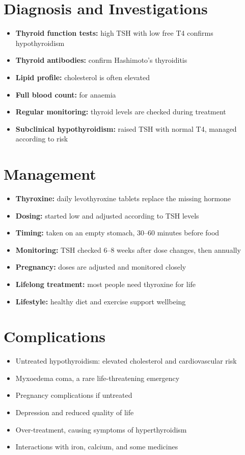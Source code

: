 \section*{Diagnosis and Investigations}
\begin{itemize}
    \item \textbf{Thyroid function tests:} high TSH with low free T4 confirms hypothyroidism
    \item \textbf{Thyroid antibodies:} confirm Hashimoto's thyroiditis
    \item \textbf{Lipid profile:} cholesterol is often elevated
    \item \textbf{Full blood count:} for anaemia
    \item \textbf{Regular monitoring:} thyroid levels are checked during treatment
    \item \textbf{Subclinical hypothyroidism:} raised TSH with normal T4, managed according to risk
\end{itemize}

\section*{Management}
\begin{itemize}
    \item \textbf{Thyroxine:} daily levothyroxine tablets replace the missing hormone
    \item \textbf{Dosing:} started low and adjusted according to TSH levels
    \item \textbf{Timing:} taken on an empty stomach, 30--60 minutes before food
    \item \textbf{Monitoring:} TSH checked 6--8 weeks after dose changes, then annually
    \item \textbf{Pregnancy:} doses are adjusted and monitored closely
    \item \textbf{Lifelong treatment:} most people need thyroxine for life
    \item \textbf{Lifestyle:} healthy diet and exercise support wellbeing
\end{itemize}

\section*{Complications}
\begin{itemize}
    \item Untreated hypothyroidism: elevated cholesterol and cardiovascular risk
    \item Myxoedema coma, a rare life-threatening emergency
    \item Pregnancy complications if untreated
    \item Depression and reduced quality of life
    \item Over-treatment, causing symptoms of hyperthyroidism
    \item Interactions with iron, calcium, and some medicines
\end{itemize}

